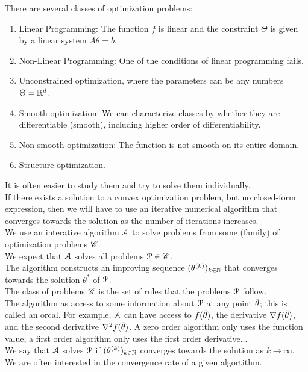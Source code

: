 \documentclass[12pt]{article}
\begin{document}
There are several classes of optimization problems:
\begin{enumerate}
    \item Linear Programming: The function $f$
    is linear and the constraint $\Theta$
    is given by a linear system $A\theta = b$.
    \item Non-Linear Programming: One of the conditions
    of linear programming fails.
    \item Unconstrained optimization, where the parameters
    can be any numbers $\Theta = \mathbb{R}^d$. 
    \item Smooth optimization: We can characterize classes
    by whether they are differentiable (smooth),
    including higher order of differentiability.
    \item Non-smooth optimization: The function is not
    smooth on its entire domain.
    \item Structure optimization.
\end{enumerate}
It is often easier to study them and try to solve them
individually. \\

If there exists a solution to a convex optimization
problem, but no closed-form expression,
then we will have to use an iterative numerical algorithm
that converges towards the solution as the number of
iterations increases. \\

We use an interative algorithm $\mathcal{A}$
to solve problems from some 
(family) of optimization problems $\mathscr{C}$. \\
We expect that $\mathcal{A}$ solves all problems $\mathcal{P} \in \mathscr{C}$. \\
The algorithm constructs an improving sequence
$(\theta^{(k)})_{k \in \mathbb{N}}$ that converges towards
the solution $\theta^*$ of $\mathcal{P}$. \\
The class of problems $\mathscr{C}$ is the set of rules
that the problems $\mathcal{P}$ follow. \\
The algorithm as access to some information about $\mathcal{P}$
at any point $\,\overline{\!{\theta}}$;
this is called an orcal. For example,
$\mathcal{A}$ can have access to $f(\,\overline{\!{\theta}})$,
the derivative $\nabla f(\,\overline{\!{\theta}})$,
and the second derivative $\nabla^2 f(\,\overline{\!{\theta}})$.
A zero order algorithm only uses the function value, 
a first order algorithm only uses the first order
derivative... \\

We say that $\mathcal{A}$ solves $\mathcal{P}$ 
if $(\theta^{(k)})_{k \in \mathbb{N}}$
converges towards the solution as $k \to \infty$. \\
We are often interested in the convergence rate
of a given algortithm. \\
 \\
\end{document}
